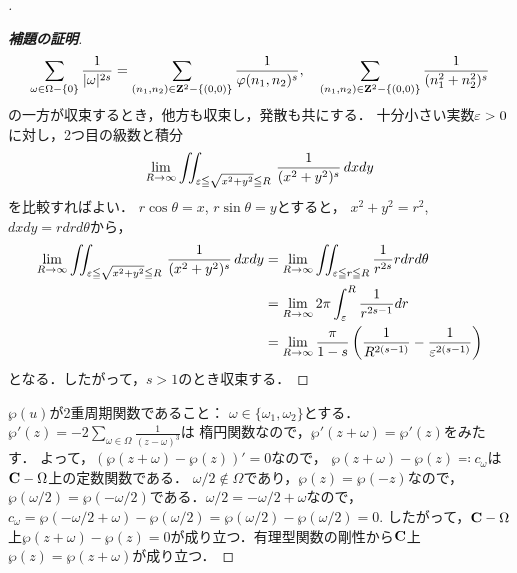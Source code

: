 \begin{proof}[\pfb]
\begin{proof}[\textbf{補題の証明}]
        \begin{align*}
            \sum_{\omega\in\Omega-\{0\}}\frac{1}{|\omega|^{2s}}
            =\sum_{(n_1,n_2)\in\mathbf{Z}^2-\{(0,0)\}}\frac{1}{\varphi(n_1,n_2)^s},\quad
            \sum_{(n_1,n_2)\in\mathbf{Z}^2-\{(0,0)\}}\frac{1}{(n_1^2+n_2^2)^s}
        \end{align*}
        の一方が収束するとき，他方も収束し，発散も共にする．
        十分小さい実数$\varepsilon>0$に対し，2つ目の級数と積分
        \begin{align*}
            \lim_{R\to\infty}\iint_{\varepsilon\leqq\sqrt{x^2+y^2}\leqq R}\,\frac{1}{(x^2+y^2)^s}\,dxdy
        \end{align*}
        を比較すればよい．
        $r\cos\theta=x$, $r\sin\theta=y$とすると，
        $x^2+y^2=r^2$, $dxdy=rdrd\theta$から，
        \begin{align*}
            \lim_{R\to\infty}\iint_{\varepsilon\leqq\sqrt{x^2+y^2}\leqq R}\,\frac{1}{(x^2+y^2)^s}\,dxdy
            &=
            \lim_{R\to\infty}
            \iint_{\varepsilon\leqq r\leqq R}\frac{1}{r^{2s}}rdrd\theta\\
            &=
            \lim_{R\to\infty} 2\pi\int_{\varepsilon}^{R}\frac{1}{r^{2s-1}}dr\\
            &=
            \lim_{R\to\infty}\frac{\pi}{1-s}\left(\frac{1}{R^{2(s-1)}}-\frac{1}{\varepsilon^{2(s-1)}}\right)
        \end{align*}
        となる．したがって，$s>1$のとき収束する．
    \end{proof}


    $\wp(u)$が2重周期関数であること：
    $\omega\in\{\omega_1,\omega_2\}$とする．$\wp'(z)=-2\sum_{\omega\in\Omega}\frac{1}{(z-\omega)^3}$は
    楕円関数なので，$\wp'(z+\omega)=\wp'(z)$をみたす．
    よって，$(\wp(z+\omega)-\wp(z))'=0$なので，
    $\wp(z+\omega)-\wp(z)\eqqcolon c_{\omega}$は$\mathbf{C}-\Omega$上の定数関数である．
    $\omega/2\notin\Omega$であり，$\wp(z)=\wp(-z)$なので，
    $\wp(\omega/2)=\wp(-\omega/2)$である．$\omega/2=-\omega/2+\omega$なので，
    $c_\omega=\wp(-\omega/2+\omega)-\wp(\omega/2)=\wp(\omega/2)-\wp(\omega/2)=0$. 
    したがって，$\mathbf{C}-\Omega$上$\wp(z+\omega)-\wp(z)=0$が成り立つ．有理型関数の剛性から$\mathbf{C}$上$\wp(z)=\wp(z+\omega)$が成り立つ．
\end{proof}

